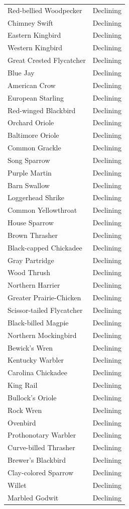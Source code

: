 \documentclass[12pt,twoside,openany]{reedthesis}
\begin{document}
\begin{longtable}{ll}
Red-bellied Woodpecker & Declining\\
Chimney Swift & Declining\\
Eastern Kingbird & Declining\\
\addlinespace
Western Kingbird & Declining\\
Great Crested Flycatcher & Declining\\
Blue Jay & Declining\\
American Crow & Declining\\
European Starling & Declining\\
\addlinespace
Red-winged Blackbird & Declining\\
Orchard Oriole & Declining\\
Baltimore Oriole & Declining\\
Common Grackle & Declining\\
Song Sparrow & Declining\\
\addlinespace
Purple Martin & Declining\\
Barn Swallow & Declining\\
Loggerhead Shrike & Declining\\
Common Yellowthroat & Declining\\
House Sparrow & Declining\\
\addlinespace
Brown Thrasher & Declining\\
Black-capped Chickadee & Declining\\
Gray Partridge & Declining\\
Wood Thrush & Declining\\
Northern Harrier & Declining\\
\addlinespace
Greater Prairie-Chicken & Declining\\
Scissor-tailed Flycatcher & Declining\\
Black-billed Magpie & Declining\\
Northern Mockingbird & Declining\\
Bewick's Wren & Declining\\
\addlinespace
Kentucky Warbler & Declining\\
Carolina Chickadee & Declining\\
King Rail & Declining\\
Bullock's Oriole & Declining\\
Rock Wren & Declining\\
\addlinespace
Ovenbird & Declining\\
Prothonotary Warbler & Declining\\
Curve-billed Thrasher & Declining\\
Brewer's Blackbird & Declining\\
Clay-colored Sparrow & Declining\\
\addlinespace
Willet & Declining\\
Marbled Godwit & Declining\\
\bottomrule
\end{longtable}
\end{document}
